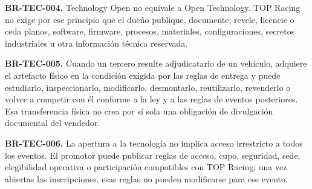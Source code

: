 \documentclass[10pt,letterpaper]{article}
\begin{document}
\noindent\textbf{BR-TEC-004.} Technology Open no equivale a Open Technology. TOP Racing no exige por ese principio que el dueño publique, documente, revele, licencie o ceda planos, software, firmware, procesos, materiales, configuraciones, secretos industriales u otra información técnica reservada.\par
\noindent\textbf{BR-TEC-005.} Cuando un tercero resulte adjudicatario de un vehículo, adquiere el artefacto físico en la condición exigida por las reglas de entrega y puede estudiarlo, inspeccionarlo, modificarlo, desmontarlo, reutilizarlo, revenderlo o volver a competir con él conforme a la ley y a las reglas de eventos posteriores. Esa transferencia física no crea por sí sola una obligación de divulgación documental del vendedor.\par
\noindent\textbf{BR-TEC-006.} La apertura a la tecnología no implica acceso irrestricto a todos los eventos. El promotor puede publicar reglas de acceso, cupo, seguridad, sede, elegibilidad operativa o participación compatibles con TOP Racing; una vez abiertas las inscripciones, esas reglas no pueden modificarse para ese evento.\par
\end{document}
